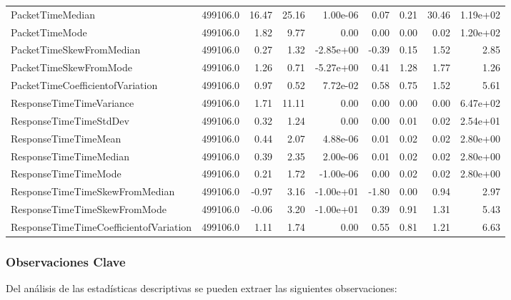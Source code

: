 \begin{table}[H]
\begin{tabular}{|l|r|r|r|r|r|r|r|r|}
        PacketTimeMedian & 499106.0 & 16.47 & 25.16 & 1.00e-06 & 0.07 & 0.21 & 30.46 & 1.19e+02 \\
        PacketTimeMode & 499106.0 & 1.82 & 9.77 & 0.00 & 0.00 & 0.00 & 0.02 & 1.20e+02 \\
        PacketTimeSkewFromMedian & 499106.0 & 0.27 & 1.32 & -2.85e+00 & -0.39 & 0.15 & 1.52 & 2.85 \\
        PacketTimeSkewFromMode & 499106.0 & 1.26 & 0.71 & -5.27e+00 & 0.41 & 1.28 & 1.77 & 1.26 \\
        PacketTimeCoefficientofVariation & 499106.0 & 0.97 & 0.52 & 7.72e-02 & 0.58 & 0.75 & 1.52 & 5.61 \\
        ResponseTimeTimeVariance & 499106.0 & 1.71 & 11.11 & 0.00 & 0.00 & 0.00 & 0.00 & 6.47e+02 \\
        ResponseTimeTimeStdDev & 499106.0 & 0.32 & 1.24 & 0.00 & 0.00 & 0.01 & 0.02 & 2.54e+01 \\
        ResponseTimeTimeMean & 499106.0 & 0.44 & 2.07 & 4.88e-06 & 0.01 & 0.02 & 0.02 & 2.80e+00 \\
        ResponseTimeTimeMedian & 499106.0 & 0.39 & 2.35 & 2.00e-06 & 0.01 & 0.02 & 0.02 & 2.80e+00 \\
        ResponseTimeTimeMode & 499106.0 & 0.21 & 1.72 & -1.00e-06 & 0.00 & 0.02 & 0.02 & 2.80e+00 \\
        ResponseTimeTimeSkewFromMedian & 499106.0 & -0.97 & 3.16 & -1.00e+01 & -1.80 & 0.00 & 0.94 & 2.97 \\
        ResponseTimeTimeSkewFromMode & 499106.0 & -0.06 & 3.20 & -1.00e+01 & 0.39 & 0.91 & 1.31 & 5.43 \\
        ResponseTimeTimeCoefficientofVariation & 499106.0 & 1.11 & 1.74 & 0.00 & 0.55 & 0.81 & 1.21 & 6.63 \\
        \hline
    \end{tabular}
\end{table}

\subsubsection{Observaciones Clave}

Del análisis de las estadísticas descriptivas se pueden extraer las siguientes observaciones:

